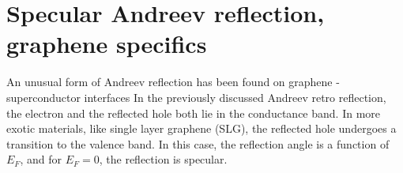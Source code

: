 \section{Specular Andreev reflection, graphene specifics}
An unusual form of Andreev reflection has been found on graphene - superconductor interfaces %
In the previously discussed Andreev retro reflection, the electron and the reflected hole both lie in the conductance band. In more exotic materials, like  single layer graphene (SLG), the reflected hole undergoes a transition to the valence band. In this case, the reflection angle is a function of $E_F$, and for $E_F = 0$, the reflection is specular. 

 